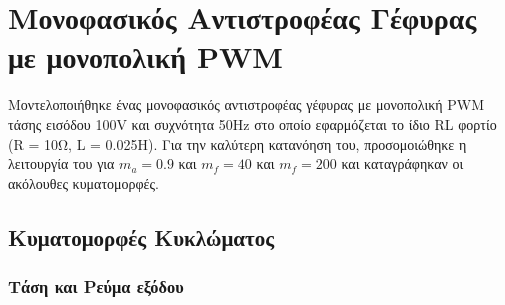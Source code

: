 \section{Μονοφασικός Αντιστροφέας Γέφυρας με μονοπολική PWM}
Μοντελοποιήθηκε ένας μονοφασικός αντιστροφέας γέφυρας με μονοπολική PWM τάσης εισόδου 100V και συχνότητα 50Hz στο οποίο εφαρμόζεται το ίδιο RL φορτίο (R = 10Ω, L = 0.025Η). Για την καλύτερη κατανόηση του, προσομοιώθηκε η λειτουργία του για $m_a = 0.9$ και $m_f = 40$  και $m_f = 200$ και καταγράφηκαν οι ακόλουθες κυματομορφές.

\subsection{Κυματομορφές Κυκλώματος}

\subsubsection*{Τάση και Ρεύμα εξόδου}
